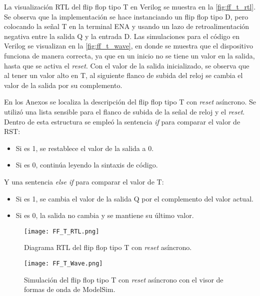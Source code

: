 La visualización RTL del flip flop tipo T en Verilog se muestra en la \autoref{fig:ff_t_rtl}. Se observa que la implementación se hace instanciando un flip flop tipo D, pero colocando la señal T en la terminal ENA y usando un lazo de retroalimentación negativa entre la salida Q y la entrada D. Las simulaciones para el código en Verilog se visualizan en la \autoref{fig:ff_t_wave}, en donde se muestra que el dispositivo funciona de manera correcta, ya que en un inicio no se tiene un valor en la salida, hasta que se activa el \textit{reset}. Con el valor de la salida inicializado, se observa que al tener un valor alto en T, al siguiente flanco de subida del reloj se cambia el valor de la salida por su complemento.

En los Anexos se localiza la descripción del flip flop tipo T con \textit{reset} asíncrono. Se utilizó una lista sensible para el flanco de subida de la señal de reloj y el \textit{reset}. Dentro de esta estructura se empleó la sentencia \textit{if} para comparar el valor de RST:

\begin{itemize}
	\item Si es 1, se restablece el valor de la salida a 0. 
	\item Si es 0, continúa leyendo la sintaxis de código.
\end{itemize}

Y una sentencia \textit{else if} para comparar el valor de T:

\begin{itemize}
	\item Si es 1, se cambia el valor de la salida Q por el complemento del valor actual. 
	\item Si es 0, la salida no cambia y se mantiene su último valor.
\end{itemize}

\begin{figure}[ht]
	\centering
	\texttt{[image: FF\_T\_RTL.png]}
	\caption{Diagrama RTL del flip flop tipo T con \textit{reset} asíncrono. \label{fig:ff_t_rtl}}
\end{figure}

\begin{figure}[ht]
	\centering
	\texttt{[image: FF\_T\_Wave.png]}
	\caption{Simulación del flip flop tipo T con \textit{reset} asíncrono con el visor de formas de onda de ModelSim. \label{fig:ff_t_wave}}
\end{figure}